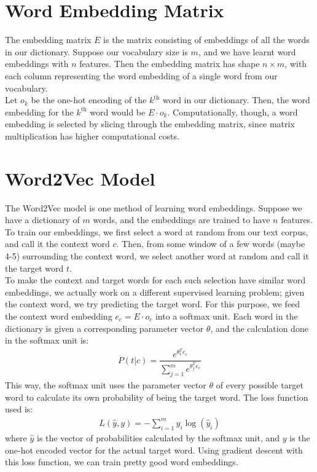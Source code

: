 \documentclass[a4paper, 12pt]{report}
\begin{document}
\section{Word Embedding Matrix}
The embedding matrix $E$ is the matrix consisting of embeddings of all the words in our dictionary. Suppose our vocabulary size is $m$, and we have learnt word embeddings with $n$ features. Then the embedding matrix has shape $n\times m$, with each column representing the word embedding of a single word from our vocabulary.\\
\break
Let $o_k$ be the one-hot encoding of the $k^{\text{th}}$ word in our dictionary. Then, the word embedding for the $k^{\text{th}}$ word would be $E\cdot o_k$. Computationally, though, a word embedding is selected by slicing through the embedding matrix, since matrix multiplication has higher computational costs.

\section{Word2Vec Model}
The Word2Vec model is one method of learning word embeddings. Suppose we have a dictionary of $m$ words, and the embeddings are trained to have $n$ features. To train our embeddings, we first select a word at random from our text corpus, and call it the context word $c$. Then, from some window of a few words (maybe 4-5) surrounding the context word, we select another word at random and call it the target word $t$.\\
\break
To make the context and target words for each such selection have similar word embeddings, we actually work on a different supervised learning problem; given the context word, we try predicting the target word. For this purpose, we feed the context word embedding $e_c = E\cdot o_c$ into a softmax unit. Each word in the dictionary is given a corresponding parameter vector $\theta$, and the calculation done in the softmax unit is:
\begin{align*}
P(t|c) = \dfrac{e^{\theta_t^T e_c}}{\sum_{j=1}^{m}e^{\theta_j^T e_c}}
\end{align*}
This way, the softmax unit uses the parameter vector $\theta$ of every possible target word to calculate its own probability of being the target word. The loss function used is:
\begin{align*}
L(\hat{y}, y) = -\sum_{i=1}^{m}y_i\log(\hat{y}_i)
\end{align*}
where $\hat{y}$ is the vector of probabilities calculated by the softmax unit, and $y$ is the one-hot encoded vector for the actual target word. Using gradient descent with this loss function, we can train pretty good word embeddings.
\end{document}
